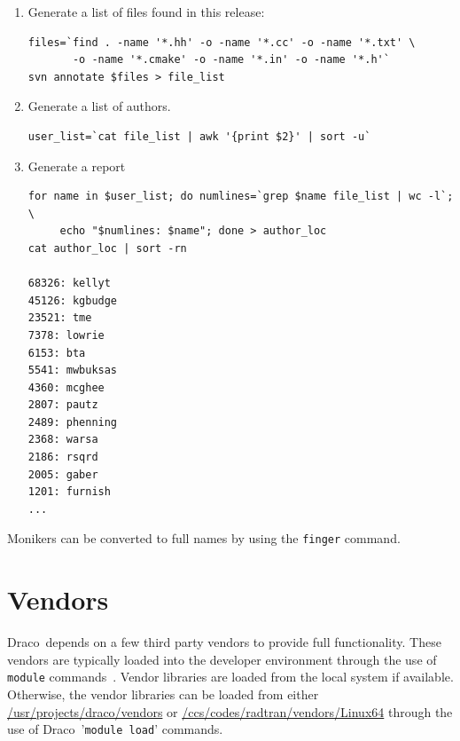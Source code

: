 \documentclass[note]{newmemo}
\newcommand{\draco}{{\normalfont\small\sffamily Draco}}
\begin{document}
\begin{enumerate}
\item Generate a list of files found in this release:
\begin{lstlisting}[basicstyle=\footnotesize, xleftmargin=0.75in, 
  xrightmargin=0.75in]
files=`find . -name '*.hh' -o -name '*.cc' -o -name '*.txt' \
       -o -name '*.cmake' -o -name '*.in' -o -name '*.h'`
svn annotate $files > file_list
\end{lstlisting}
\item Generate a list of authors.
\begin{lstlisting}[basicstyle=\footnotesize, xleftmargin=0.75in, 
  xrightmargin=0.75in]
user_list=`cat file_list | awk '{print $2}' | sort -u`
\end{lstlisting}
\item Generate a report
\begin{lstlisting}[basicstyle=\footnotesize, xleftmargin=0.75in, 
  xrightmargin=0.75in]
for name in $user_list; do numlines=`grep $name file_list | wc -l`; \
     echo "$numlines: $name"; done > author_loc
cat author_loc | sort -rn

68326: kellyt
45126: kgbudge
23521: tme
7378: lowrie
6153: bta
5541: mwbuksas
4360: mcghee
2807: pautz
2489: phenning
2368: warsa
2186: rsqrd
2005: gaber
1201: furnish
...
\end{lstlisting}
\end{enumerate}

Monikers can be converted to full names by using the \texttt{finger}
command. 


\section{Vendors}
\label{sec:vendors}

\draco\ depends on a few third party vendors to provide full
functionality.  These vendors are typically loaded into the developer
environment through the use of \texttt{module}
commands~\cite{modulecmd}.  Vendor libraries are loaded from the local
system if available.  Otherwise, the vendor libraries can be loaded
from either \url{/usr/projects/draco/vendors} or
\url{/ccs/codes/radtran/vendors/Linux64} through the use of
\draco\ '\texttt{module load}' commands.
\end{document}
